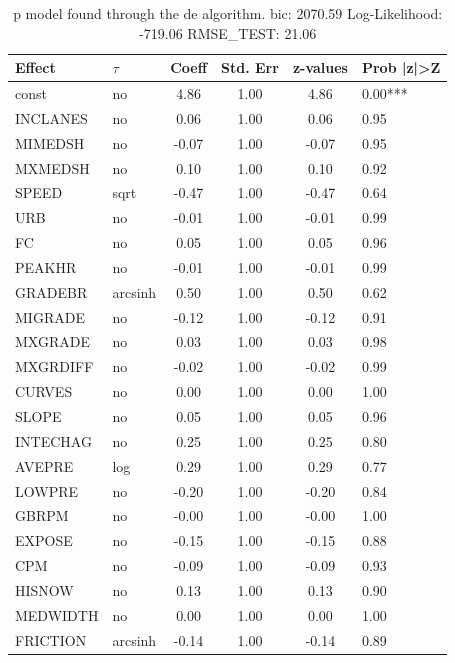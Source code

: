 \begin{table}
	\caption{p model found through the de algorithm. bic: 2070.59 Log-Likelihood: -719.06 RMSE_TEST: 21.06}
	\begin{center}
		\begin{tabular}{|l|l|c|c|c|l|}
			\hline
			Effect & $\tau$ & Coeff & Std. Err & z-values & Prob |z|>Z \\
			\hline
			const & no & 4.86 & 1.00 & 4.86 & 0.00*** \\
			\hline
			INCLANES & no & 0.06 & 1.00 & 0.06 & 0.95 \\
			\hline
			MIMEDSH & no & -0.07 & 1.00 & -0.07 & 0.95 \\
			\hline
			MXMEDSH & no & 0.10 & 1.00 & 0.10 & 0.92 \\
			\hline
			SPEED & sqrt & -0.47 & 1.00 & -0.47 & 0.64 \\
			\hline
			URB & no & -0.01 & 1.00 & -0.01 & 0.99 \\
			\hline
			FC & no & 0.05 & 1.00 & 0.05 & 0.96 \\
			\hline
			PEAKHR & no & -0.01 & 1.00 & -0.01 & 0.99 \\
			\hline
			GRADEBR & arcsinh & 0.50 & 1.00 & 0.50 & 0.62 \\
			\hline
			MIGRADE & no & -0.12 & 1.00 & -0.12 & 0.91 \\
			\hline
			MXGRADE & no & 0.03 & 1.00 & 0.03 & 0.98 \\
			\hline
			MXGRDIFF & no & -0.02 & 1.00 & -0.02 & 0.99 \\
			\hline
			CURVES & no & 0.00 & 1.00 & 0.00 & 1.00 \\
			\hline
			SLOPE & no & 0.05 & 1.00 & 0.05 & 0.96 \\
			\hline
			INTECHAG & no & 0.25 & 1.00 & 0.25 & 0.80 \\
			\hline
			AVEPRE & log & 0.29 & 1.00 & 0.29 & 0.77 \\
			\hline
			LOWPRE & no & -0.20 & 1.00 & -0.20 & 0.84 \\
			\hline
			GBRPM & no & -0.00 & 1.00 & -0.00 & 1.00 \\
			\hline
			EXPOSE & no & -0.15 & 1.00 & -0.15 & 0.88 \\
			\hline
			CPM & no & -0.09 & 1.00 & -0.09 & 0.93 \\
			\hline
			HISNOW & no & 0.13 & 1.00 & 0.13 & 0.90 \\
			\hline
			MEDWIDTH & no & 0.00 & 1.00 & 0.00 & 1.00 \\
			\hline
			FRICTION & arcsinh & -0.14 & 1.00 & -0.14 & 0.89 \\

\end{tabular}
\end{center}
\end{table}

